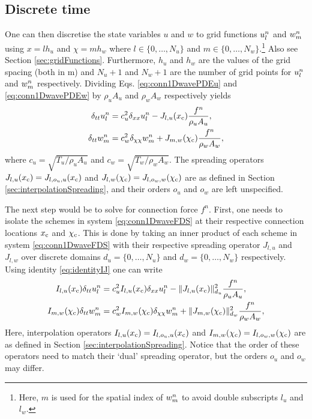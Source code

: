 \subsection{Discrete time}
One can then discretise the state variables $u$ and $w$ to grid functions $u_l^n$ and $w_m^n$ using $x = lh_u$ and $\chi = mh_w$ where $l\in \{0, \hdots, N_u\}$ and $m\in \{0, \hdots, N_w\}$.\footnote{Here, $m$ is used for the spatial index of $w_m^n$ to avoid double subscripts $l_u$ and $l_w$.} Also see Section \ref{sec:gridFunctions}. Furthermore, $h_u$ and $h_w$ are the values of the grid spacing (both in m) and $N_u+1$ and $N_w+1$ are the number of grid points for $u_l^n$ and $w_m^n$ respectively. Dividing Eqs. \eqref{eq:conn1DwavePDEu} and \eqref{eq:conn1DwavePDEw} by $\rho_u A_u$ and $\rho_w A_w$ respectively yields
\begin{subequations}\label{eq:conn1DwaveFDS}
    \begin{align}
        \delta_{tt} u_l^n &= c_u^2 \delta_{xx} u_l^n -J_{l, u}(x_{\text{c}})\frac{f^n}{\rho_u A_u}, \label{eq:conn1DwaveFDSu} \\
        \delta_{tt} w_m^n &= c_w^2 \delta_{\chi\chi} w_m^n + J_{m, w}(\chi_{\text{c}})\frac{f^n}{\rho_w A_w},\label{eq:conn1DwaveFDSw}
    \end{align}
\end{subequations}
where $c_u = \sqrt{T_u / \rho_uA_u}$ and $c_w = \sqrt{T_w / \rho_wA_w}$. The spreading operators $J_{l, u}(x_{\text{c}}) = J_{l, o_u, u}(x_{\text{c}})$ and $J_{l, w}(\chi_{\text{c}}) = J_{l, o_w, w}(\chi_{\text{c}})$ are as defined in Section \ref{sec:interpolationSpreading}, and their orders $o_u$ and $o_w$ are left unspecified. 

The next step would be to solve for connection force $f^n$. First, one needs to isolate the schemes in system \eqref{eq:conn1DwaveFDS} at their respective connection locations $x_{\text{c}}$ and $\chi_{\text{c}}$. This is done by taking an inner product of each scheme in system \eqref{eq:conn1DwaveFDS} with their respective spreading operator $J_{l, u}$ and $J_{l, w}$ over discrete domains $d_u = \{0, \hdots, N_u\}$ and $d_w = \{0, \hdots, N_w\}$ respectively. Using identity \eqref{eq:identityIJ} one can write
\begin{subequations}\label{eq:conn1DwaveFDSXc}
    \begin{align}
        I_{l, u}(x_{\text{c}})\delta_{tt} u_l^n &= c_u^2 I_{l, u}(x_{\text{c}})\delta_{xx} u_l^n -\lVert J_{l, u}(x_{\text{c}})\rVert_{d_u}^2\frac{f^n}{\rho_u A_u}, \label{eq:conn1DwaveuXc} \\
        I_{m, w}(\chi_{\text{c}})\delta_{tt} w_m^n &= c_w^2 I_{m, w}(\chi_{\text{c}})\delta_{\chi\chi} w_m^n + \lVert J_{m, w}(\chi_{\text{c}})\rVert_{d_w}^2\frac{f^n}{\rho_w A_w},\label{eq:conn1DwavewXc}
    \end{align}
\end{subequations}
Here, interpolation operators $I_{l, u}(x_{\text{c}}) = I_{l, o_u, u}(x_{\text{c}})$ and $I_{m, w}(\chi_{\text{c}}) = I_{l, o_w, w}(\chi_{\text{c}})$ are as defined in Section \ref{sec:interpolationSpreading}. Notice that the order of these operators need 
to match their `dual' spreading operator, but the orders $o_u$ and $o_w$ may differ.

